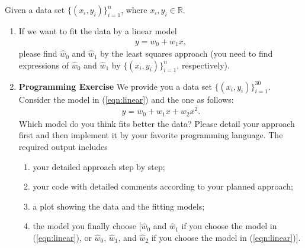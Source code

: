 \documentclass[11pt,letter,notitlepage]{article}
\begin{document}
\begin{exercise}
	Given a data set $\{ (x_i ,y_i) \}_{i=1}^{n}$, where $x_i,y_i\in \mathbb{R}$.
	\begin{enumerate}
		\item If we want to fit the data by a linear model
		      \begin{align}\label{eqn:linear}
			      y =  w_0 + w_1 x,
		      \end{align}
		      please find $\hat{w}_0$ and $\hat{w}_1$ by the least squares approach (you need to find expressions of $\hat{w}_0$ and $\hat{w}_1$ by $\{ (x_i ,y_i) \}_{i=1}^{n}$, respectively).
		\item \textbf{Programming Exercise} We provide you a data set $\{ (x_i ,y_i) \}_{i=1}^{30}$. Consider the model in (\ref{eqn:linear}) and the one as follows:
		      \begin{align}\label{eqn:linear-quadratic}
			      y =  w_0 + w_1 x+ w_2 x^2.
		      \end{align}
		      Which model do you think fits better the data? Please detail your approach first and then implement it by your favorite programming language. The required output includes
		      \begin{enumerate}
			      \item your detailed approach step by step;
			      \item your code with detailed comments according to your planned approach;
			      \item a plot showing the data and the fitting models;
			      \item the model you finally choose [$\hat{w}_0$ and $\hat{w}_1$ if you choose the model in (\ref{eqn:linear}), or $\hat{w}_0$, $\hat{w}_1$, and $\hat{w}_2$ if you choose the model in (\ref{eqn:linear})].
		      \end{enumerate}
	\end{enumerate}

\end{exercise}
\end{document}
